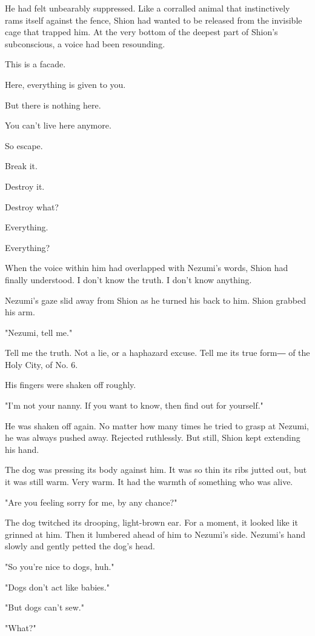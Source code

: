 He had felt unbearably suppressed. Like a corralled animal that
instinctively rams itself against the fence, Shion had wanted to be
released from the invisible cage that trapped him. At the very bottom of
the deepest part of Shion's subconscious, a voice had been resounding.

This is a facade.

Here, everything is given to you.

But there is nothing here.

You can't live here anymore.

So escape.

Break it.

Destroy it.

Destroy what?

Everything.

Everything?

When the voice within him had overlapped with Nezumi's words, Shion had
finally understood. I don't know the truth. I don't know anything.

Nezumi's gaze slid away from Shion as he turned his back to him. Shion
grabbed his arm.

"Nezumi, tell me."

Tell me the truth. Not a lie, or a haphazard excuse. Tell me its true
form― of the Holy City, of No. 6.

His fingers were shaken off roughly.

"I'm not your nanny. If you want to know, then find out for yourself."

He was shaken off again. No matter how many times he tried to grasp at
Nezumi, he was always pushed away. Rejected ruthlessly. But still, Shion
kept extending his hand.

The dog was pressing its body against him. It was so thin its ribs
jutted out, but it was still warm. Very warm. It had the warmth of
something who was alive.

"Are you feeling sorry for me, by any chance?"

The dog twitched its drooping, light-brown ear. For a moment, it looked
like it grinned at him. Then it lumbered ahead of him to Nezumi's side.
Nezumi's hand slowly and gently petted the dog's head.

"So you're nice to dogs, huh."

"Dogs don't act like babies."

"But dogs can't sew."

"What?"

